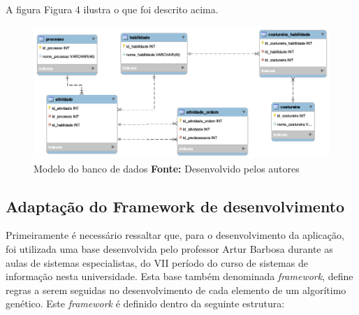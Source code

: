 \par A figura Figura 4 ilustra o que foi descrito acima.

\begin{figure}[h!]
	\centerline{\includegraphics[scale=0.6]{./imagens/model_tcc.png}}
	\caption[Modelo do banco de dados]
	{Modelo do banco de dados \textbf{Fonte:} Desenvolvido pelos autores}
	\label{fig:exemplo1}
\end{figure}

\subsection{Adaptação do Framework de desenvolvimento}
\par Primeiramente é necessário ressaltar que, para o desenvolvimento da aplicação, foi utilizada uma base desenvolvida pelo professor Artur Barbosa durante as aulas de sistemas especialistas, do VII período do curso de sistemas de informação nesta universidade.
Esta base também denominada \textit{framework}, define regras a serem seguidas no desenvolvimento de cada elemento
de um algorítimo genético. Este \textit{framework} é definido dentro da seguinte estrutura:

